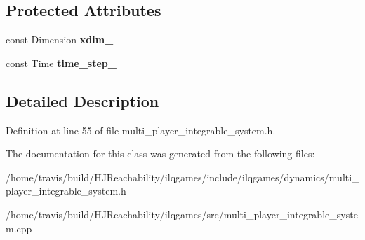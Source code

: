 \subsection*{Protected Attributes}
\begin{DoxyCompactItemize}
\item 
const Dimension {\bfseries xdim\+\_\+}\hypertarget{classilqgames_1_1_multi_player_integrable_system_ad6f5958f0f51492aa1d368765f417a19}{}\label{classilqgames_1_1_multi_player_integrable_system_ad6f5958f0f51492aa1d368765f417a19}

\item 
const Time {\bfseries time\+\_\+step\+\_\+}\hypertarget{classilqgames_1_1_multi_player_integrable_system_adbd2c27a82e441fab50201f583a869f2}{}\label{classilqgames_1_1_multi_player_integrable_system_adbd2c27a82e441fab50201f583a869f2}

\end{DoxyCompactItemize}


\subsection{Detailed Description}


Definition at line 55 of file multi\+\_\+player\+\_\+integrable\+\_\+system.\+h.



The documentation for this class was generated from the following files\+:\begin{DoxyCompactItemize}
\item 
/home/travis/build/\+H\+J\+Reachability/ilqgames/include/ilqgames/dynamics/multi\+\_\+player\+\_\+integrable\+\_\+system.\+h\item 
/home/travis/build/\+H\+J\+Reachability/ilqgames/src/multi\+\_\+player\+\_\+integrable\+\_\+system.\+cpp\end{DoxyCompactItemize}
